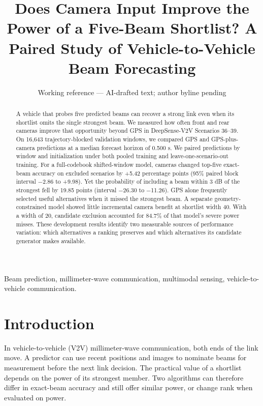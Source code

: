 \documentclass[10pt,journal,letterpaper]{IEEEtran}
\begin{document}
\title{Does Camera Input Improve the Power of a Five-Beam Shortlist? A Paired Study of Vehicle-to-Vehicle Beam Forecasting}

\author{Working reference --- AI-drafted text; author byline pending}

\maketitle

\begin{abstract}

A vehicle that probes five predicted beams can recover a strong link even when its shortlist omits the single strongest beam. We measured how often front and rear cameras improve that opportunity beyond GPS in DeepSense-V2V Scenarios 36--39. On 16,643 trajectory-blocked validation windows, we compared GPS and GPS-plus-camera predictions at a median forecast horizon of 0.500 s. We paired predictions by window and initialization under both pooled training and leave-one-scenario-out training. For a full-codebook shifted-window model, cameras changed top-five exact-beam accuracy on excluded scenarios by +5.42 percentage points (95\% paired block interval \ensuremath{-}2.86 to +9.98). Yet the probability of including a beam within 3 dB of the strongest fell by 19.85 points (interval \ensuremath{-}26.30 to \ensuremath{-}11.26). GPS alone frequently selected useful alternatives when it missed the strongest beam. A separate geometry-constrained model showed little incremental camera benefit at shortlist width 40. With a width of 20, candidate exclusion accounted for 84.7\% of that model's severe power misses. These development results identify two measurable sources of performance variation: which alternatives a ranking preserves and which alternatives its candidate generator makes available.

\end{abstract}

\begin{IEEEkeywords}Beam prediction, millimeter-wave communication, multimodal sensing, vehicle-to-vehicle communication.\end{IEEEkeywords}

\section{Introduction}

In vehicle-to-vehicle (V2V) millimeter-wave communication, both ends of the link move. A predictor can use recent positions and images to nominate beams for measurement before the next link decision. The practical value of a shortlist depends on the power of its strongest member. Two algorithms can therefore differ in exact-beam accuracy and still offer similar power, or change rank when evaluated on power.
\end{document}
